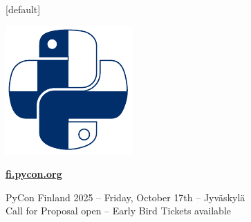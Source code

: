\documentclass[12pt,aspectratio=169]{beamer}
\begin{document}

{
\begin{frame}[plain]
\end{frame}
}


[default]
\begin{frame}
\vfill
\huge
\centering \includegraphics[height=0.50\paperheight]{images/PyCon-Finland.pdf}
\par
\textbf{\href{https://pyconfi.ploneconf.org}{fi.pycon.org}}
\par
\normalsize
\vfill
PyCon Finland 2025 – Friday, October 17th – Jyväskylä \\
Call for Proposal open – Early Bird Tickets available
\vfill
\end{frame}

\end{document}
